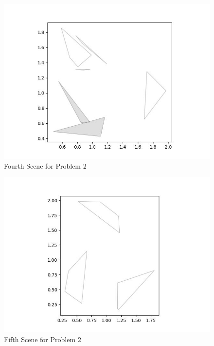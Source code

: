 \documentclass{article}
\begin{document}
\begin{figure}[h!]
	\includegraphics[width= 0.9 \linewidth]{Problem2_scene4.jpg}
	\centering
	\caption{Fourth Scene for Problem 2}
	\label{Problem2_scene4.jpg}
\end{figure}

\begin{figure}[h!]
	\includegraphics[width= 0.9 \linewidth]{Problem2_scene5.jpg}
	\centering
	\caption{Fifth Scene for Problem 2}
	\label{Problem2_scene5.jpg}
\end{figure}
\end{document}
